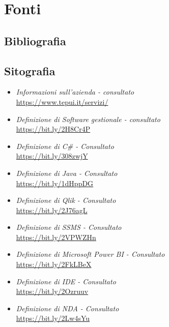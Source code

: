 

\cleardoublepage
\chapter{Fonti}

\section*{Bibliografia}

\section*{Sitografia}
\begin{itemize}
	\item \textit{Informazioni sull'azienda - consultato \todo}\\
	\url{https://www.tepui.it/servizi/}
	
	\item \textit{Definizione di Software gestionale - consultato \todo}\\
	\url{https://bit.ly/2H8Cr4P}
	
	\item \textit{Definizione di C\# - Consultato \todo}\\
	\url{https://bit.ly/308zwjY}
	
	\item \textit{Definizione di Java - Consultato \todo}\\
	\url{https://bit.ly/1dHppDG} 
	
	\item \textit{Definizione di Qlik - Consultato \todo}\\
	\url{https://bit.ly/2J76agL} 
	
	\item \textit{Definizione di SSMS - Consultato \todo}\\
	\url{https://bit.ly/2VPWZHn} 
	
	\item \textit{Definizione di Microsoft Power BI - Consultato \todo}\\
	\url{https://bit.ly/2FkLBeX}
	
	\item \textit{Definizione di IDE - Consultato \todo}\\
	\url{https://bit.ly/2Ozruuv}
	
	\item \textit{Definizione di NDA - Consultato \todo}\\
	\url{https://bit.ly/2Lw4sYu}
\end{itemize}





